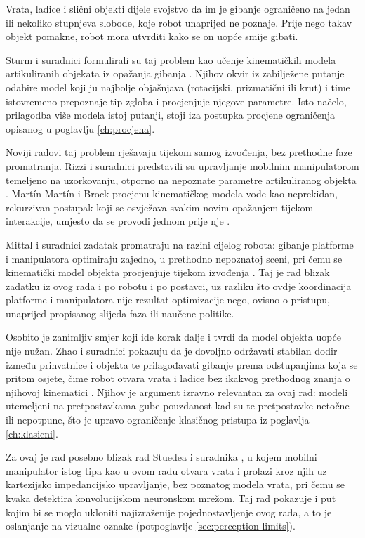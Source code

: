 Vrata, ladice i slični objekti dijele svojstvo da im je gibanje ograničeno na jedan ili nekoliko
stupnjeva slobode, koje robot unaprijed ne poznaje. Prije nego takav objekt pomakne, robot mora
utvrditi kako se on uopće smije gibati.

Sturm i suradnici formulirali su taj problem kao učenje kinematičkih modela artikuliranih
objekata iz opažanja gibanja \cite{sturm2011probabilistic}. Njihov okvir iz zabilježene putanje
odabire model koji ju najbolje objašnjava (rotacijski, prizmatični ili krut) i time
istovremeno prepoznaje tip zgloba i procjenjuje njegove parametre. Isto načelo, prilagodba više
modela istoj putanji, stoji iza postupka procjene ograničenja opisanog u poglavlju
\ref{ch:procjena}.

Noviji radovi taj problem rješavaju tijekom samog izvođenja, bez prethodne faze promatranja.
Rizzi i suradnici predstavili su upravljanje mobilnim manipulatorom temeljeno na uzorkovanju,
otporno na nepoznate parametre artikuliranog objekta \cite{rizzi2023articulated}. Martín-Martín i
Brock procjenu kinematičkog modela vode kao neprekidan, rekurzivan postupak koji se osvježava
svakim novim opažanjem tijekom interakcije, umjesto da se provodi jednom prije nje
\cite{martinmartin2022coupled}.

Mittal i suradnici zadatak promatraju na razini cijelog robota: gibanje platforme i manipulatora
optimiraju zajedno, u prethodno nepoznatoj sceni, pri čemu se kinematički model objekta
procjenjuje tijekom izvođenja \cite{mittal2022articulated}. Taj je rad blizak zadatku iz ovog
rada i po robotu i po postavci, uz razliku što ovdje koordinacija platforme i manipulatora nije
rezultat optimizacije nego, ovisno o pristupu, unaprijed propisanog slijeda faza ili naučene
politike.

Osobito je zanimljiv smjer koji ide korak dalje i tvrdi da model objekta uopće nije nužan. Zhao i
suradnici pokazuju da je dovoljno održavati stabilan dodir između prihvatnice i objekta te
prilagođavati gibanje prema odstupanjima koja se pritom osjete, čime robot otvara vrata i ladice
bez ikakvog prethodnog znanja o njihovoj kinematici \cite{zhao2024tacman}. Njihov je argument
izravno relevantan za ovaj rad: modeli utemeljeni na pretpostavkama gube pouzdanost kad su te
pretpostavke netočne ili nepotpune, što je upravo ograničenje klasičnog pristupa iz poglavlja
\ref{ch:klasicni}.

Za ovaj je rad posebno blizak rad Stuedea i suradnika \cite{stuede2019door}, u kojem mobilni
manipulator istog tipa kao u ovom radu otvara vrata i prolazi kroz njih uz kartezijsko
impedancijsko upravljanje, bez poznatog modela vrata, pri čemu se kvaka detektira konvolucijskom
neuronskom mrežom. Taj rad pokazuje i put kojim bi se moglo ukloniti najizraženije
pojednostavljenje ovog rada, a to je oslanjanje na vizualne oznake (potpoglavlje
\ref{sec:perception-limits}).

